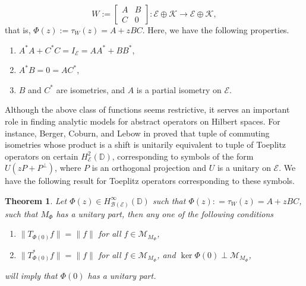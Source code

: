 \documentclass[12pt]{amsart}
\numberwithin{equation}{section}
\newtheorem{thm}[propn]{Theorem}
\theoremstyle{definition}
\newcommand{\D}{\mathbb{D}}
\newcommand{\1}{{\mbox{\bf 1}}}
\newcommand{\clb}{\mathcal{B}}
\newcommand{\cle}{\mathcal{E}}
\newcommand{\clk}{\mathcal{K}}
\newcommand{\clm}{\mathcal{M}}
\newcommand{\raro}{\rightarrow}
\begin{document}
\[
W:= \begin{bmatrix}
A & B\\
C & 0
\end{bmatrix}: \cle \oplus \clk \raro \cle \oplus \clk,
\]
that is, $\Phi(z):= \tau_W(z) = A + zBC$.  Here, we have the following properties.
\begin{enumerate}
\item[(a)] $A^*A + C^*C = I_{\cle} = AA^* + BB^*$,
\item[(b)] $A^*B = 0 = AC^*$,
\item[(c)] $B$ and $C^*$ are isometries, and $A$ is a partial isometry on $\cle$.
\end{enumerate}
Although the above class of functions seems restrictive, it serves an important role in finding analytic models for abstract operators on Hilbert spaces. For instance, Berger, Coburn, and Lebow in \cite{BCL} proved that tuple of commuting isometries whose product is a shift is unitarily equivalent to tuple of Toeplitz operators on certain $H_{\cle}^2(\D)$, corresponding to symbols of the form $U(zP+P^{\perp})$, where $P$ is an orthogonal projection and $U$ is a unitary on $\cle$. We have the following result for Toeplitz operators corresponding to these symbols.
\begin{thm}
Let $\Phi(z) \in H_{\clb(\cle)}^{\infty}(\D)$ such that $\Phi(z): = \tau_W(z) = A+zBC$, such that $M_{\Phi}$ has a unitary part, then any one of the following conditions
\begin{enumerate}
\item[(i)] $\|T_{\Phi(0)}f\| = \|f\|$ for all $f \in \clm_{M_{\Phi}}$,
\item[(ii)] $\|T_{\Phi(0)}^*f\| = \|f\|$ for all $f \in \clm_{M_{\Phi}}$, and $\ker \Phi(0) \perp \clm_{M_{\Phi}}$,
\end{enumerate}
will imply that $\Phi(0)$ has a unitary part.
\end{thm}
\end{document}
